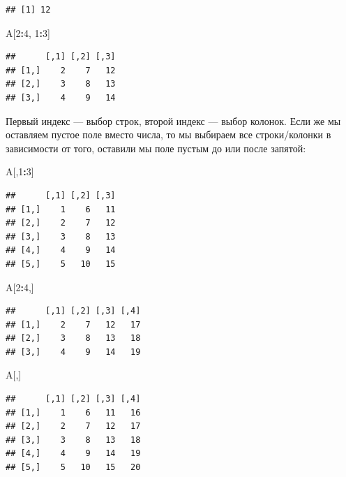\documentclass[
]{book}
\newenvironment{Shaded}{\begin{snugshade}}{\end{snugshade}}
\newcommand{\DecValTok}[1]{\textcolor[rgb]{0.00,0.00,0.81}{#1}}
\newcommand{\NormalTok}[1]{#1}
\newcommand{\OperatorTok}[1]{\textcolor[rgb]{0.81,0.36,0.00}{\textbf{#1}}}
\begin{document}
\begin{verbatim}
## [1] 12
\end{verbatim}

\begin{Shaded}
\begin{Highlighting}[]
\NormalTok{A[}\DecValTok{2}\OperatorTok{:}\DecValTok{4}\NormalTok{, }\DecValTok{1}\OperatorTok{:}\DecValTok{3}\NormalTok{]}
\end{Highlighting}
\end{Shaded}

\begin{verbatim}
##      [,1] [,2] [,3]
## [1,]    2    7   12
## [2,]    3    8   13
## [3,]    4    9   14
\end{verbatim}

Первый индекс --- выбор строк, второй индекс --- выбор колонок. Если же мы оставляем пустое поле вместо числа, то мы выбираем все строки/колонки в зависимости от того, оставили мы поле пустым до или после запятой:

\begin{Shaded}
\begin{Highlighting}[]
\NormalTok{A[,}\DecValTok{1}\OperatorTok{:}\DecValTok{3}\NormalTok{]}
\end{Highlighting}
\end{Shaded}

\begin{verbatim}
##      [,1] [,2] [,3]
## [1,]    1    6   11
## [2,]    2    7   12
## [3,]    3    8   13
## [4,]    4    9   14
## [5,]    5   10   15
\end{verbatim}

\begin{Shaded}
\begin{Highlighting}[]
\NormalTok{A[}\DecValTok{2}\OperatorTok{:}\DecValTok{4}\NormalTok{,]}
\end{Highlighting}
\end{Shaded}

\begin{verbatim}
##      [,1] [,2] [,3] [,4]
## [1,]    2    7   12   17
## [2,]    3    8   13   18
## [3,]    4    9   14   19
\end{verbatim}

\begin{Shaded}
\begin{Highlighting}[]
\NormalTok{A[,]}
\end{Highlighting}
\end{Shaded}

\begin{verbatim}
##      [,1] [,2] [,3] [,4]
## [1,]    1    6   11   16
## [2,]    2    7   12   17
## [3,]    3    8   13   18
## [4,]    4    9   14   19
## [5,]    5   10   15   20
\end{verbatim}
\end{document}
